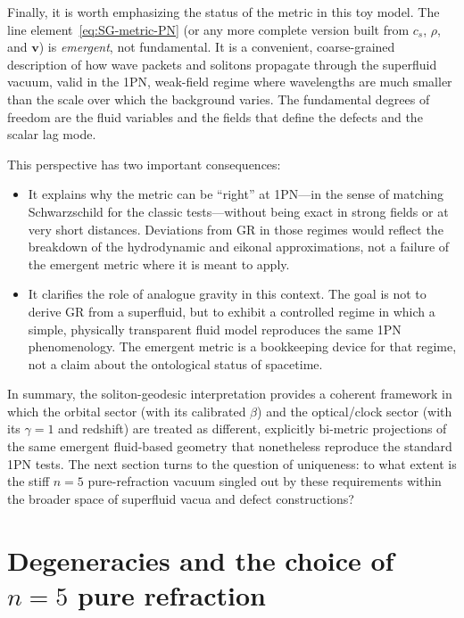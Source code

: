 \documentclass[11pt]{article}
\begin{document}
Finally, it is worth emphasizing the status of the metric in this toy
model.
The line element~\eqref{eq:SG-metric-PN} (or any more complete version
built from $c_s$, $\rho$, and $\mathbf{v}$) is \emph{emergent}, not
fundamental.
It is a convenient, coarse-grained description of how wave packets and
solitons propagate through the superfluid vacuum, valid in the 1PN,
weak-field regime where wavelengths are much smaller than the scale over
which the background varies.
The fundamental degrees of freedom are the fluid variables and the fields
that define the defects and the scalar lag mode.

This perspective has two important consequences:

\begin{itemize}
  \item It explains why the metric can be ``right'' at 1PN---in the sense of
        matching Schwarzschild for the classic tests---without being exact in
        strong fields or at very short distances.
        Deviations from GR in those regimes would reflect the breakdown of
        the hydrodynamic and eikonal approximations, not a failure of the
        emergent metric where it is meant to apply.

  \item It clarifies the role of analogue gravity in this context.
        The goal is not to derive GR from a superfluid, but to exhibit a
        controlled regime in which a simple, physically transparent fluid
        model reproduces the same 1PN phenomenology.
        The emergent metric is a bookkeeping device for that regime, not a
        claim about the ontological status of spacetime.
\end{itemize}

In summary, the soliton-geodesic interpretation provides a coherent
framework in which the orbital sector (with its calibrated $\beta$) and
the optical/clock sector (with its $\gamma=1$ and redshift) are treated as
different, explicitly bi-metric projections of the same emergent
fluid-based geometry that nonetheless reproduce the standard 1PN tests.
The next section turns to the question of uniqueness: to what extent is the
stiff $n=5$ pure-refraction vacuum singled out by these requirements within
the broader space of superfluid vacua and defect constructions?

\section{Degeneracies and the choice of \texorpdfstring{$n=5$}{n=5} pure refraction}
\label{sec:degeneracies}
\end{document}
